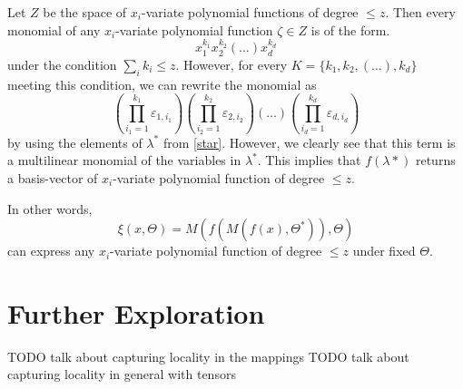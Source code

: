\documentclass[11pt]{article}
\theoremstyle{definition}
\theoremstyle{definition}
\begin{document}
Let $Z$ be the space of $x_i$-variate polynomial functions 
of degree $\leq z$. Then every monomial of any $x_i$-variate polynomial function
$\zeta \in Z$ is of the form.
\begin{equation}
    x_{1}^{k_1}x_{2}^{k_2}(\dots)x_{d}^{k_d}
\end{equation}
under the condition $\sum_{i}k_i \leq z$. 
However, for every $K = \{k_1, k_2, (\dots), k_d\}$ meeting this condition,
we can rewrite the monomial as
\begin{equation}
    \left( \prod_{i_1=1}^{k_1}\varepsilon_{1, i_1} \right)
    \left( \prod_{i_2=1}^{k_2}\varepsilon_{2, i_2} \right)
    \left( \dots \right)
    \left( \prod_{i_d=1}^{k_d}\varepsilon_{d, i_d} \right)
\end{equation}
by using the elements of $\lambda^*$ from \eqref{star}.
However, we clearly see that this term is a multilinear 
monomial of the variables in $\lambda^*$. This implies that
$f(\lambda*)$ returns a basis-vector of $x_i$-variate polynomial 
function of degree $\leq z$.

In other words, 
\begin{equation}
    \xi \left( x, \Theta \right) =
        M
        \left(
            f
            \left(
                M
                \left(
                    f
                    \left(
                        x 
                    \right),
                    \Theta^*
                \right)
            \right),
            \Theta
        \right)
\end{equation}
can express any $x_i$-variate polynomial function of degree $\leq z$ under
fixed $\Theta$.

\section{Further Exploration}
TODO talk about capturing locality in the mappings
TODO talk about capturing locality in general with tensors


\printbibliography
\end{document}
